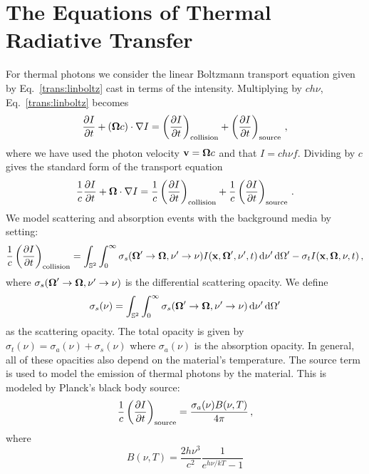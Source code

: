 \documentclass[../doc.tex]{subfiles}
\begin{document}
\section{The Equations of Thermal Radiative Transfer}
For thermal photons we consider the linear Boltzmann transport equation given by Eq.~\ref{trans:linboltz} cast in terms of the intensity. Multiplying by $c h\nu $, Eq.~\ref{trans:linboltz} becomes 
	\begin{equation}
		\frac{\partial I}{\partial t} + (\boldsymbol{\Omega} c) \cdot \nabla I = \left( \frac{\partial I}{\partial t} \right)_\text{collision} + \left( \frac{\partial I}{\partial t} \right)_\text{source} \,, 
	\end{equation}
where we have used the photon velocity $\boldsymbol{\mathrm{v}} = \boldsymbol{\Omega} c$ and that $I = ch\nu f$. Dividing by $c$ gives the standard form of the transport equation 
	\begin{equation}
		\frac{1}{c}\frac{\partial I}{\partial t} + \boldsymbol{\Omega}\cdot \nabla I = \frac{1}{c} \left( \frac{\partial I}{\partial t} \right)_\text{collision} + \frac{1}{c}\left( \frac{\partial I}{\partial t} \right)_\text{source} \,. 
	\end{equation}
We model scattering and absorption events with the background media by setting: 
	\begin{equation}
		\frac{1}{c}\left( \frac{\partial I}{\partial t} \right)_\text{collision} = \int_{\mathbb{S}^2} \int_0^\infty \sigma_s(\boldsymbol{\Omega}'\rightarrow \boldsymbol{\Omega}, \nu' \rightarrow \nu) I(\boldsymbol{\mathrm{x}},\boldsymbol{\Omega}',\nu',t) \mathop{}\!\mathrm{d} \nu' \mathop{}\!\mathrm{d} \Omega' - \sigma_t I(\boldsymbol{\mathrm{x}},\boldsymbol{\Omega},\nu,t) \,,
	\end{equation}
where $\sigma_s(\boldsymbol{\Omega}'\rightarrow\boldsymbol{\Omega},\nu'\rightarrow \nu)$ is the differential scattering opacity. 
We define 
	\begin{equation}
		\sigma_s(\nu) = \int_{\mathbb{S}^2} \int_0^\infty \sigma_s(\boldsymbol{\Omega}'\rightarrow\boldsymbol{\Omega},\nu'\rightarrow\nu) \mathop{}\!\mathrm{d} \nu'\mathop{}\!\mathrm{d}\Omega'	
	\end{equation}
as the scattering opacity. The total opacity is given by $\sigma_t(\nu) = \sigma_a(\nu) + \sigma_s(\nu)$ where $\sigma_a(\nu)$ is the absorption opacity. In general, all of these opacities also depend on the material's temperature. The source term is used to model the emission of thermal photons by the material. This is modeled by Planck's black body source: 
	\begin{equation}
		\frac{1}{c}\left( \frac{\partial I}{\partial t} \right)_\text{source} =\frac{\sigma_a(\nu) B(\nu,T)}{4\pi} \,,
	\end{equation}
where
	\begin{equation}
		B(\nu,T) = \frac{2h\nu^3}{c^2}\frac{1}{e^{h\nu/kT}-1}
	\end{equation}
\end{document}
